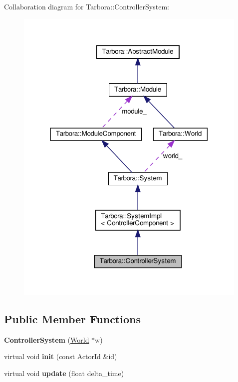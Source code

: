 Collaboration diagram for Tarbora\+:\+:Controller\+System\+:
\nopagebreak
\begin{figure}[H]
\begin{center}
\leavevmode
\includegraphics[width=316pt]{classTarbora_1_1ControllerSystem__coll__graph}
\end{center}
\end{figure}
\subsection*{Public Member Functions}
\begin{DoxyCompactItemize}
\item 
\mbox{\label{classTarbora_1_1ControllerSystem_af2f2f8df2b467fb113fdcc38c48784e8}} 
{\bfseries Controller\+System} (\hyperlink{classTarbora_1_1World}{World} $\ast$w)
\item 
\mbox{\label{classTarbora_1_1ControllerSystem_ac117af8c62be21fe5bf9188b32606009}} 
virtual void {\bfseries init} (const Actor\+Id \&id)
\item 
\mbox{\label{classTarbora_1_1ControllerSystem_a3798b5b50d140e986a6cfc1b4467bc7b}} 
virtual void {\bfseries update} (float delta\+\_\+time)
\end{DoxyCompactItemize}
